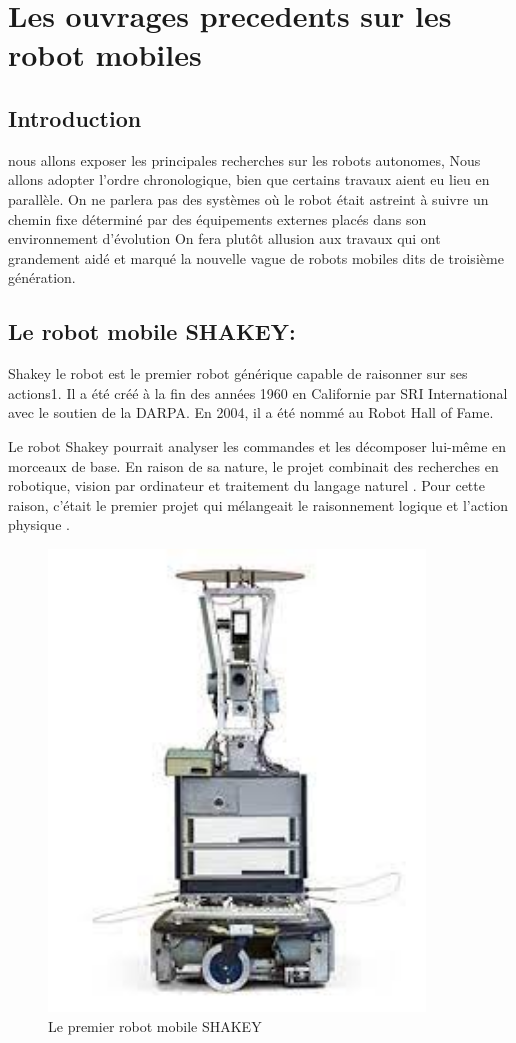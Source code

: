 \chapter{Les ouvrages precedents sur les robot mobiles}
\section{Introduction}
nous allons exposer les principales recherches sur les robots autonomes, Nous allons adopter l'ordre chronologique, bien que certains travaux aient eu lieu en parallèle. On ne parlera pas des systèmes où le robot était astreint à suivre un chemin fixe déterminé par des équipements externes placés dans son environnement d'évolution On fera plutôt allusion aux travaux qui ont grandement aidé et marqué la nouvelle vague de robots mobiles dits de troisième génération.

\section{Le robot mobile SHAKEY:}
Shakey le robot est le premier robot générique capable de raisonner sur ses actions1. Il a été créé à la fin des années 1960 en Californie par SRI International avec le soutien de la DARPA. En 2004, il a été nommé au Robot Hall of Fame.\cite{ShakeyRobot2022}

Le robot Shakey pourrait analyser les commandes et les décomposer lui-même en morceaux de base. En raison de sa nature, le projet combinait des recherches en robotique, vision par ordinateur et traitement du langage naturel . Pour cette raison, c'était le premier projet qui mélangeait le raisonnement logique et l'action physique \cite{ShakyRobot}.

\newpage
\begin{figure}[h]
    \centering
    \includegraphics[width=10cm]{assets/Chapter2/ShakeyBot.jpeg}
    \caption{Le premier robot mobile SHAKEY \cite{ShakeyRobot2022}}
    \label{shakeybot}
    \end{figure}

